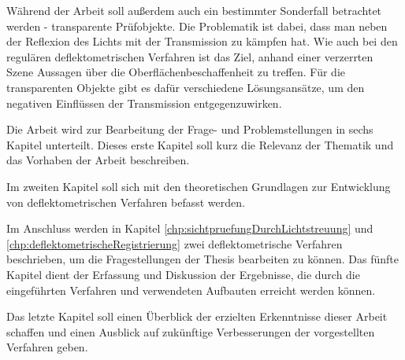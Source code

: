 \p
Während der Arbeit soll außerdem auch ein bestimmter Sonderfall betrachtet werden - transparente Prüfobjekte.
Die Problematik ist dabei, dass man neben der Reflexion des Lichts mit der Transmission zu kämpfen hat.
Wie auch bei den regulären deflektometrischen Verfahren ist das Ziel, anhand einer verzerrten Szene Aussagen über die Oberflächenbeschaffenheit zu treffen.
Für die transparenten Objekte gibt es dafür verschiedene Lösungsansätze, um den negativen Einflüssen der Transmission entgegenzuwirken.

\p
Die Arbeit wird zur Bearbeitung der Frage- und Problemstellungen in sechs Kapitel unterteilt. 
Dieses erste Kapitel soll kurz die Relevanz der Thematik und das Vorhaben der Arbeit beschreiben.

\p
Im zweiten Kapitel soll sich mit den theoretischen Grundlagen zur Entwicklung von deflektometrischen Verfahren befasst werden.

\p
Im Anschluss werden in Kapitel \ref{chp:sichtpruefungDurchLichtstreuung} und \ref{chp:deflektometrischeRegistrierung} zwei deflektometrische Verfahren beschrieben, um die Fragestellungen der Thesis bearbeiten zu können.
\p
Das fünfte Kapitel dient der Erfassung und Diskussion der Ergebnisse, die durch die eingeführten Verfahren und verwendeten Aufbauten erreicht werden können.

\p
Das letzte Kapitel soll einen Überblick der erzielten Erkenntnisse dieser Arbeit schaffen und einen Ausblick auf zukünftige Verbesserungen der vorgestellten Verfahren geben.
